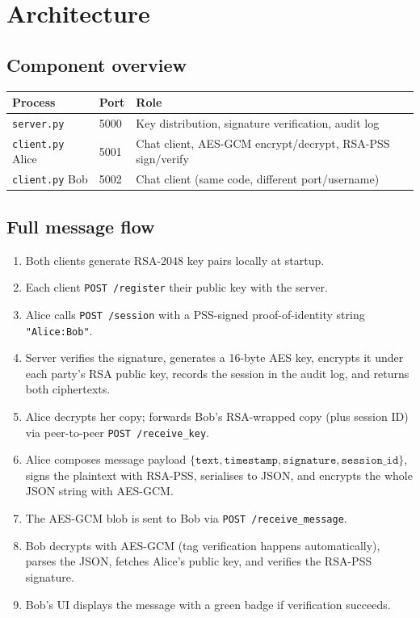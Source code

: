 \documentclass[12pt,a4paper]{article}
\begin{document}
\section{Architecture}

\subsection{Component overview}

\begin{center}
\begin{tabular}{llp{8cm}}
\toprule
\textbf{Process} & \textbf{Port} & \textbf{Role} \\
\midrule
\texttt{server.py} & 5000 & Key distribution, signature verification, audit log \\
\texttt{client.py} Alice & 5001 & Chat client, AES-GCM encrypt/decrypt, RSA-PSS sign/verify \\
\texttt{client.py} Bob & 5002 & Chat client (same code, different port/username) \\
\bottomrule
\end{tabular}
\end{center}

\subsection{Full message flow}

\begin{enumerate}[noitemsep]
  \item Both clients generate RSA-2048 key pairs locally at startup.
  \item Each client \texttt{POST /register} their public key with the server.
  \item Alice calls \texttt{POST /session} with a PSS-signed proof-of-identity string \texttt{"Alice:Bob"}.
  \item Server verifies the signature, generates a 16-byte AES key, encrypts it under each party's RSA public key, records the session in the audit log, and returns both ciphertexts.
  \item Alice decrypts her copy; forwards Bob's RSA-wrapped copy (plus session ID) via peer-to-peer \texttt{POST /receive\_key}.
  \item Alice composes message payload \(\{\texttt{text},\texttt{timestamp},\texttt{signature},\texttt{session\_id}\}\), signs the plaintext with RSA-PSS, serialises to JSON, and encrypts the whole JSON string with AES-GCM.
  \item The AES-GCM blob is sent to Bob via \texttt{POST /receive\_message}.
  \item Bob decrypts with AES-GCM (tag verification happens automatically), parses the JSON, fetches Alice's public key, and verifies the RSA-PSS signature.
  \item Bob's UI displays the message with a green badge if verification succeeds.
\end{enumerate}
\end{document}
